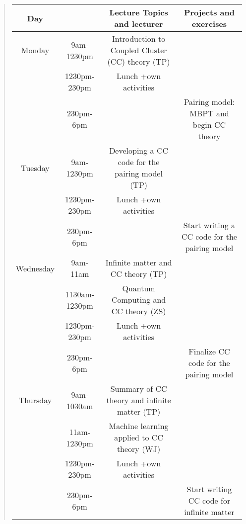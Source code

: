 \documentclass[%
oneside,                 %
final,                   %
10pt]{article}
\begin{document}
\begin{quote}
\begin{tabular}{cccc}
\hline
\multicolumn{1}{c}{ Day } & \multicolumn{1}{c}{  } & \multicolumn{1}{c}{ Lecture Topics and lecturer } & \multicolumn{1}{c}{ Projects and exercises } \\
\hline
Monday    & 9am-1230pm    & Introduction to Coupled Cluster (CC) theory (TP)  &                                               \\
          & 1230pm-230pm  & Lunch +own activities                             &                                               \\
          & 230pm-6pm     &                                                   & Pairing model: MBPT and begin CC theory       \\
\hline
Tuesday   & 9am-1230pm    & Developing a CC code for the pairing model (TP)   &                                               \\
          & 1230pm-230pm  & Lunch +own activities                             &                                               \\
          & 230pm-6pm     &                                                   & Start writing a CC code for the pairing model \\
\hline
Wednesday & 9am-11am      & Infinite matter and CC theory (TP)                &                                               \\
          & 1130am-1230pm & Quantum Computing and CC theory (ZS)              &                                               \\
          & 1230pm-230pm  & Lunch +own activities                             &                                               \\
          & 230pm-6pm     &                                                   & Finalize CC code for the pairing model        \\
\hline
Thursday  & 9am-1030am    & Summary of CC theory and infinite matter (TP)     &                                               \\
          & 11am-1230pm   & Machine learning applied to CC theory (WJ)        &                                               \\
          & 1230pm-230pm  & Lunch +own activities                             &                                               \\
          & 230pm-6pm     &                                                   & Start writing CC code for infinite matter     \\

\end{tabular}
\end{quote}
\end{document}
